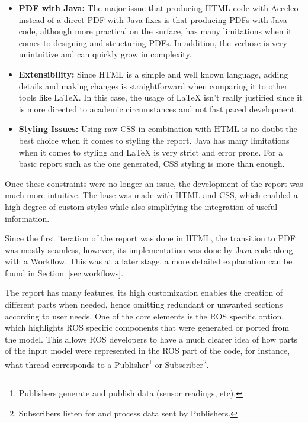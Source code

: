\begin{itemize} 
	\item \textbf{PDF with Java:} The major issue that producing \gls{HTML} code with Acceleo instead of a direct PDF with Java fixes is that producing PDFs with Java code, although more practical on the surface, has many limitations when it comes to designing and structuring PDFs. In addition, the verbose is very unintuitive and can quickly grow in complexity.
	\item \textbf{Extensibility:} Since \gls{HTML} is a simple and well known language, adding details and making changes is straightforward when comparing it to other tools like LaTeX. In this case, the usage of LaTeX isn't really justified since it is more directed to academic circumstances and not fast paced development. 
	\item \textbf{Styling Issues:} Using raw \gls{CSS} in combination with \gls{HTML} is no doubt the best choice when it comes to styling the report. Java has many limitations when it comes to styling and LaTeX is very strict and error prone. For a basic report such as the one generated, \gls{CSS} styling is more than enough.
\end{itemize}

Once these constraints were no longer an issue, the development of the report was much more intuitive. The base was made with \gls{HTML} and \gls{CSS}, which enabled a high degree of custom styles while also simplifying the integration of useful information. 

Since the first iteration of the report was done in \gls{HTML}, the transition to PDF was mostly seamless, however, its implementation was done by Java code along with a Workflow. This was at a later stage, a more detailed explanation can be found in Section~\ref{sec:workflows}.

The report has many features, its high customization enables the creation of different parts when needed, hence omitting redundant or unwanted sections according to user needs. One of the core elements is the \gls{ROS} specific option, which highlights \gls{ROS} specific components that were generated or ported from the model. This allows \gls{ROS} developers to have a much clearer idea of how parts of the input model were represented in the \gls{ROS} part of the code, for instance, what thread corresponds to a Publisher\footnote{Publishers generate and publish data (sensor readings, etc).} or Subscriber\footnote{Subscribers listen for and process data sent by Publishers.}.

